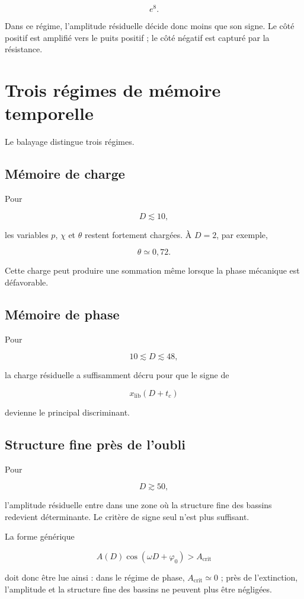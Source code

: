 \[
e^8.
\]

Dans ce régime, l'amplitude résiduelle décide donc moins que son signe.
Le côté positif est amplifié vers le puits positif ; le côté négatif
est capturé par la résistance.

\section{Trois régimes de mémoire temporelle}
\label{annexe-num-trois-regimes}

Le balayage distingue trois régimes.

\subsection{Mémoire de charge}

Pour

\[
D\lesssim10,
\]

les variables \(p\), \(\chi\) et \(\theta\) restent fortement
chargées. À \(D=2\), par exemple,

\[
\theta\simeq0{,}72.
\]

Cette charge peut produire une sommation même lorsque la phase
mécanique est défavorable.

\subsection{Mémoire de phase}

Pour

\[
10\lesssim D\lesssim48,
\]

la charge résiduelle a suffisamment décru pour que le signe de

\[
x_{\mathrm{lib}}(D+t_c)
\]

devienne le principal discriminant.

\subsection{Structure fine près de l'oubli}

Pour

\[
D\gtrsim50,
\]

l'amplitude résiduelle entre dans une zone où la structure fine des
bassins redevient déterminante. Le critère de signe seul n'est plus
suffisant.

La forme générique

\[
A(D)\cos(\omega D+\varphi_0)>A_{\mathrm{crit}}
\]

doit donc être lue ainsi : dans le régime de phase,
\(A_{\mathrm{crit}}\simeq0\) ; près de l'extinction, l'amplitude et la
structure fine des bassins ne peuvent plus être négligées.

